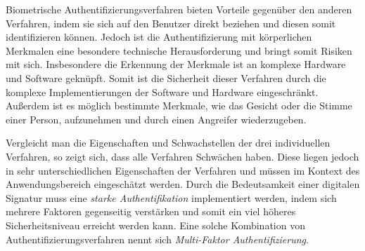 \documentclass[11pt,a4paper,ngerman]{scrreprt}
\begin{document}
\begin{description}[font=\rmfamily]
    \item[Biometrie] Biometrische Authentifizierungsverfahren bieten Vorteile gegenüber den anderen Verfahren, indem sie sich auf den Benutzer direkt beziehen und diesen somit identifizieren können. Jedoch ist die Authentifizierung mit körperlichen Merkmalen eine besondere technische Herausforderung und bringt somit Risiken mit sich. Insbesondere die Erkennung der Merkmale ist an komplexe Hardware und Software geknüpft. Somit ist die Sicherheit dieser Verfahren durch die komplexe Implementierungen der Software und Hardware eingeschränkt. Außerdem ist es möglich bestimmte Merkmale, wie das Gesicht oder die Stimme einer Person, aufzunehmen und durch einen Angreifer wiederzugeben.
\end{description}
Vergleicht man die Eigenschaften und Schwachstellen der drei individuellen Verfahren, so zeigt sich, dass alle Verfahren Schwächen haben. Diese liegen jedoch in sehr unterschiedlichen Eigenschaften der Verfahren und müssen im Kontext des Anwendungsbereich eingeschätzt werden. Durch die Bedeutsamkeit einer digitalen Signatur muss eine \emph{starke Authentifikation} implementiert werden, indem sich mehrere Faktoren gegenseitig verstärken und somit ein viel höheres Sicherheitsniveau erreicht werden kann. Eine solche Kombination von Authentifizierungsverfahren nennt sich \emph{Multi-Faktor Authentifizierung}.
\begingroup
\renewcommand{\arraystretch}{1.15}
\end{document}
